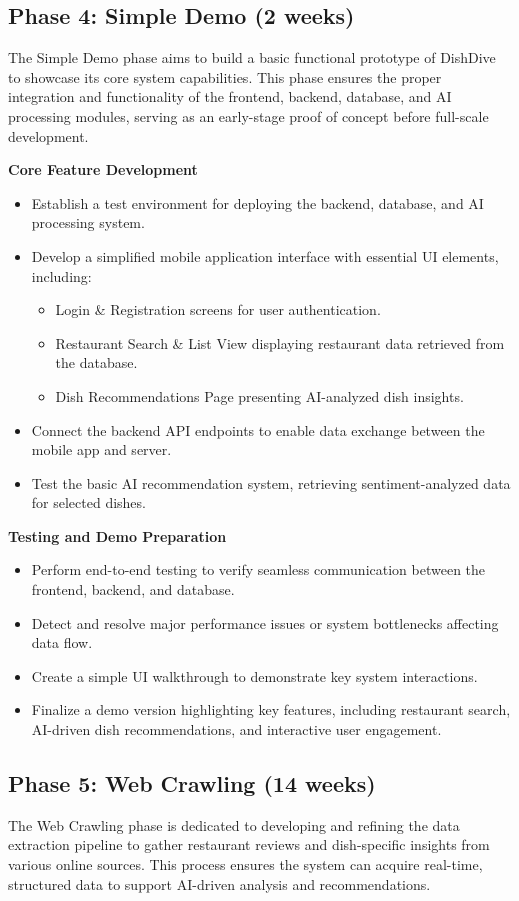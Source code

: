 \subsection*{Phase 4: Simple Demo (2 weeks)}
The Simple Demo phase aims to build a basic functional prototype of DishDive to showcase its core system capabilities. This phase ensures the proper integration and functionality of the frontend, backend, database, and AI processing modules, serving as an early-stage proof of concept before full-scale development.

\textbf{Core Feature Development}
\begin{itemize}
\item Establish a test environment for deploying the backend, database, and AI processing system.
\item Develop a simplified mobile application interface with essential UI elements, including:
	\begin{itemize}
	\item Login \& Registration screens for user authentication.
	\item Restaurant Search \& List View displaying restaurant data retrieved from the database.
	\item Dish Recommendations Page presenting AI-analyzed dish insights.
	\end{itemize}
\item Connect the backend API endpoints to enable data exchange between the mobile app and server.
\item Test the basic AI recommendation system, retrieving sentiment-analyzed data for selected dishes.
\end{itemize}

\textbf{Testing and Demo Preparation}
\begin{itemize}
\item Perform end-to-end testing to verify seamless communication between the frontend, backend, and database.
\item Detect and resolve major performance issues or system bottlenecks affecting data flow.
\item Create a simple UI walkthrough to demonstrate key system interactions.
\item Finalize a demo version highlighting key features, including restaurant search, AI-driven dish recommendations, and interactive user engagement.
\end{itemize}

\subsection*{Phase 5: Web Crawling (14 weeks)}
The Web Crawling phase is dedicated to developing and refining the data extraction pipeline to gather restaurant reviews and dish-specific insights from various online sources. This process ensures the system can acquire real-time, structured data to support AI-driven analysis and recommendations.

